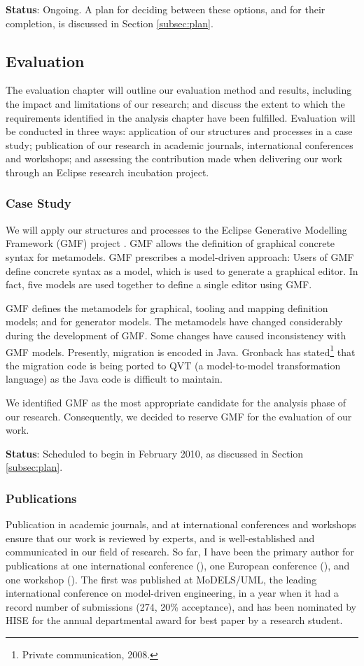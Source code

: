 \textbf{Status}: Ongoing. A plan for deciding between these options, and for their completion, is discussed in Section \ref{subsec:plan}.


\subsection{Evaluation}
The evaluation chapter will outline our evaluation method and results, including the impact and limitations of our research; and discuss the extent to which the requirements identified in the analysis chapter have been fulfilled. Evaluation will be conducted in three ways: application of our structures and processes in a case study; publication of our research in academic journals, international conferences and workshops; and assessing the contribution made when delivering our work through an Eclipse research incubation project.

\subsubsection{Case Study}
\label{subsubsec:case_study}
We will apply our structures and processes to the Eclipse Generative Modelling Framework (GMF) project \cite{gronback06gmf}. GMF allows the definition of graphical concrete syntax for metamodels. GMF prescribes a model-driven approach: Users of GMF define concrete syntax as a model, which is used to generate a graphical editor. In fact, five models are used together to define a single editor using GMF.

GMF defines the metamodels for graphical, tooling and mapping definition models; and for generator models. The metamodels have changed considerably during the development of GMF. Some changes have caused inconsistency with GMF models. Presently, migration is encoded in Java. Gronback has stated\footnote{Private communication, 2008.} that the migration code is being ported to QVT (a model-to-model transformation language) as the Java code is difficult to maintain.

We identified GMF as the most appropriate candidate for the analysis phase of our research. Consequently, we decided to reserve GMF for the evaluation of our work.

\textbf{Status}: Scheduled to begin in February 2010, as discussed in Section \ref{subsec:plan}.


\subsubsection{Publications}
\label{subsubsec:publications}
Publication in academic journals, and at international conferences and workshops ensure that our work is reviewed by experts, and is well-established and communicated in our field of research. So far, I have been the primary author for publications at one international conference (\cite{rose08hutn}), one European conference (\cite{rose08egl}), and one workshop (\cite{rose09patterns}). The first was published at MoDELS/UML, the leading international conference on model-driven engineering, in a year when it had a record number of submissions (274, 20\% acceptance), and has been nominated by HISE for the annual departmental award for best paper by a research student.

